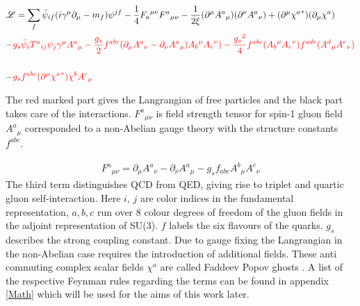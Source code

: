 \begin{equation}
\begin{split}
& \mathscr{L} = \sum_f \bar{\psi}_{if} (i\gamma^{\mu} {\partial}_{\mu}-m_f){\psi}^{jf}-\frac{1}{4}{F_a}^{\mu \nu}{F^a}_{\mu \nu}-\frac{1}{2\xi}(\partial^{\mu} {A^a}_{\mu})(\partial^{\nu} {A^a}_{\nu})+(\partial^{\mu} {\chi^a}^*)(\partial_{\mu} {\chi^a})\\
&{\color[RGB]{255,0,0} -g_s \bar{\psi}_{i} {T^a}_{ij}{\psi}_{j} \gamma^{\mu} {A^a}_{\mu}-\frac{g_s}{2} f^{abc}(\partial_{\mu} {A^a}_{\nu}-\partial_{\nu} {A^a}_{\mu}){A_b}^{\mu}{A_c}^{\nu})-\frac{{g_s}^2}{4} f^{abc} ({A_b}^{\mu}{A_c}^{\nu})f^{ade} ({A^d}_{\mu} {A^e}_{\nu})}\\
\\
&{\color[RGB]{255,0,0} -g_s f^{abc} (\partial^{\mu} {\chi^a}^{*}){\chi^b}{A^c}_{\mu}}\\
\end{split}
\end{equation}

The red marked part gives the Langrangian of free particles and the black part takes care of the interactions. ${F^a}_{\mu \nu}$ is field strength tensor for spin-1 gluon field $ {A^a}_{\mu} $ corresponded to a non-Abelian gauge theory with the structure constants $ f^{abc} $.

\begin{equation}
\begin{split}
{F^a}_{\mu \nu}= \partial_\mu {A^a}_{\nu}-\partial_\nu {A^a}_{\mu}-g_s f_{abc} {A^b}_{\mu} {A^c}_{\nu}
\end{split}
\end{equation}
The third term distinguishes QCD from QED, giving rise to triplet and quartic gluon self-interaction.
Here $i$, $j$ are color indices in the fundamental representation, $a, b , c$ run over 8 colour degrees of freedom of the gluon fields in the adjoint representation of SU(3). $f$ labels the six flavours of the quarks. $ g_s $ describes the strong coupling constant. Due to gauge fixing the Langrangian in the non-Abelian case requires the introduction of additional fields. These anti commuting complex scalar fields $ {\chi^a} $ are called Faddeev Popov ghosts \cite{Schwartz:2013pla, peskin2018introduction}. A list of the respective Feynman rules regarding the terms can be found in appendix \ref{Math}  which will be used for the aims of this work later.

%

\label{Feynman}

\pagebreak


